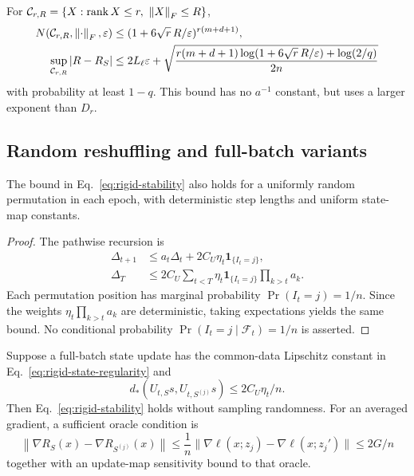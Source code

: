 \begin{corollary}
For $\mathcal C_{r,R}=\{X:\rnk X\leq r,\ \nn X\leq R\}$,
\begin{align}
N(\mathcal C_{r,R},\left\lVert\cdot\right\rVert_F,\varepsilon)
&\leq(1+6\sqrt r\,R/\varepsilon)^{r(m+d+1)},\\
\sup_{\mathcal C_{r,R}}|R-R_S|
&\leq2L_\ell\varepsilon+
\sqrt{\frac{r(m+d+1)\log(1+6\sqrt r\,R/\varepsilon)+
\log(2/q)}{2n}}
\end{align}
with probability at least $1-q$.
This bound has no $a^{-1}$ constant, but uses a larger exponent than $D_r$.
\end{corollary}



\subsection{Random reshuffling and full-batch variants}
\begin{corollary}
The bound in Eq.~\eqref{eq:rigid-stability} also holds for a uniformly
random permutation in each epoch, with deterministic step lengths and
uniform state-map constants.
\end{corollary}
\begin{proof}
The pathwise recursion is
\begin{align}
\Delta_{t+1}&\leq a_t\Delta_t+
2C_U\eta_t\mathbf1_{\{I_t=j\}},\\
\Delta_T&\leq
2C_U\sum_{t<T}\eta_t\mathbf1_{\{I_t=j\}}
\prod_{k>t}a_k .
\end{align}
Each permutation position has marginal probability
$\Pr(I_t=j)=1/n$. Since the weights $\eta_t\prod_{k>t}a_k$ are
deterministic, taking expectations yields the same bound.
No conditional probability $\Pr(I_t=j\mid\mathcal F_t)=1/n$ is asserted.
\end{proof}

\begin{corollary}
Suppose a full-batch state update has the common-data Lipschitz constant
in Eq.~\eqref{eq:rigid-state-regularity} and
\begin{equation}
d_*(U_{t,S}s,U_{t,S^{(j)}}s)\leq2C_U\eta_t/n .
\end{equation}
Then Eq.~\eqref{eq:rigid-stability} holds without sampling randomness.
For an averaged gradient, a sufficient oracle condition is
\begin{equation}
\left\|\nabla R_S(x)-\nabla R_{S^{(j)}}(x)\right\|
\leq\frac1n\|\nabla\ell(x;z_j)-\nabla\ell(x;z_j')\|
\leq2G/n
\end{equation}
together with an update-map sensitivity bound to that oracle.
\end{corollary}

